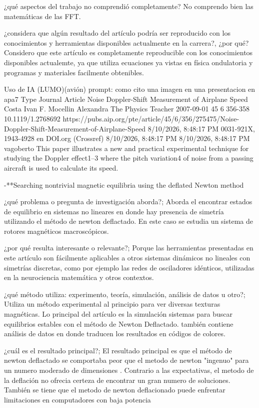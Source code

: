 \documentclass{article}
\begin{document}
¿qué aspectos del trabajo no comprendió completamente?
No comprendo bien las matemáticas de las FFT.


¿considera que algún resultado del artículo podría ser reproducido con los conocimientos y
herramientas disponibles actualmente en la carrera?, ¿por qué?
Considero que este artículo es completamente reproducible con los conocimientos disponibles actualemte, ya que utiliza ecuaciones ya vistas en física ondulatoria y programas y materiales facilmente obtenibles.

Uso de IA (LUMO)(avión)
prompt:
como cito una imagen en una presentacion en apa7
Type Journal Article Noise Doppler-Shift Measurement of Airplane Speed Costa Ivan F. Mocellin Alexandra The Physics Teacher 2007-09-01 45 6 356-358 10.1119/1.2768692 https://pubs.aip.org/pte/article/45/6/356/275475/Noise-Doppler-Shift-Measurement-of-Airplane-Speed 8/10/2026, 8:48:17 PM 0031-921X, 1943-4928 en DOI.org (Crossref) 8/10/2026, 8:48:17 PM 8/10/2026, 8:48:17 PM vagoberto This paper illustrates a new and practical experimental technique for studying the Doppler effect1–3 where the pitch variation4 of noise from a passing aircraft is used to calculate its speed.



-**Searching nontrivial magnetic equilibria using the deflated Newton method 

¿qué problema o pregunta de investigación aborda?;
Aborda el encontrar estados de equilibrio en sistemas  no lineares en donde hay presencia de simetría utilizando el método de newton deflactado. En este caso se estudia un sistema de rotores magnéticos macroscópicos.

¿por qué resulta interesante o relevante?;
Porque las herramientas presentadas en este artículo son fácilmente aplicables a otros sistemas dinámicos no lineales con simetrías discretas, como por ejemplo las redes de osciladores idénticos, utilizadas en la neurociencia matemática y otros contextos.

¿qué método utiliza: experimento, teoría, simulación, análisis de datos u otro?;
Utiliza un método experimental al principio para ver diversas texturas magnéticas. Lo principal del artículo es la simulación sistemas para buscar equilibrios estables con el método de Newton Deflactado. también contiene análisis de datos en donde traducen los resultados en códigos de colores.

¿cuál es el resultado principal?;
El resultado principal es que el método de newton deflactado se comportaba peor que el metodo de newton "ingenuo" para un numero moderado de dimensiones . Contrario a las expectativas, el metodo de la deflación no  ofrecia certeza de encontrar un gran numero de soluciones. También se tiene que el metodo de newton deflacionado puede enfrentar limitaciones en computadores con baja potencia
\end{document}
